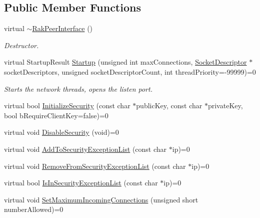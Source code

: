 \subsection*{Public Member Functions}
\begin{DoxyCompactItemize}
\item 
\hypertarget{class_rak_net_1_1_rak_peer_interface_a154354ae29d11ac06ef34bd64a8dd6aa}{virtual \hyperlink{class_rak_net_1_1_rak_peer_interface_a154354ae29d11ac06ef34bd64a8dd6aa}{$\sim$\-Rak\-Peer\-Interface} ()}\label{class_rak_net_1_1_rak_peer_interface_a154354ae29d11ac06ef34bd64a8dd6aa}

\begin{DoxyCompactList}\small\item\em Destructor. \end{DoxyCompactList}\item 
virtual Startup\-Result \hyperlink{class_rak_net_1_1_rak_peer_interface_ad360d12ceb7d7448b598c451fffd2d9c}{Startup} (unsigned int max\-Connections, \hyperlink{struct_rak_net_1_1_socket_descriptor}{Socket\-Descriptor} $\ast$socket\-Descriptors, unsigned socket\-Descriptor\-Count, int thread\-Priority=-\/99999)=0
\begin{DoxyCompactList}\small\item\em Starts the network threads, opens the listen port. \end{DoxyCompactList}\item 
virtual bool \hyperlink{class_rak_net_1_1_rak_peer_interface_ab5389821efb5d09470f8429925766eb3}{Initialize\-Security} (const char $\ast$public\-Key, const char $\ast$private\-Key, bool b\-Require\-Client\-Key=false)=0
\item 
virtual void \hyperlink{class_rak_net_1_1_rak_peer_interface_aab566dbe8f666dfed108aaaabc7a0ca6}{Disable\-Security} (void)=0
\item 
virtual void \hyperlink{class_rak_net_1_1_rak_peer_interface_a5ba3e8713e5d7b150ed393eced79675d}{Add\-To\-Security\-Exception\-List} (const char $\ast$ip)=0
\item 
virtual void \hyperlink{class_rak_net_1_1_rak_peer_interface_a8eba6b20dcba02453d1ed2ad77499f7d}{Remove\-From\-Security\-Exception\-List} (const char $\ast$ip)=0
\item 
virtual bool \hyperlink{class_rak_net_1_1_rak_peer_interface_a2672cee4147e50818769e3573fb5c459}{Is\-In\-Security\-Exception\-List} (const char $\ast$ip)=0
\item 
virtual void \hyperlink{class_rak_net_1_1_rak_peer_interface_a1f279ee0d3578de483126f6cfef282f4}{Set\-Maximum\-Incoming\-Connections} (unsigned short number\-Allowed)=0

\end{DoxyCompactItemize}
